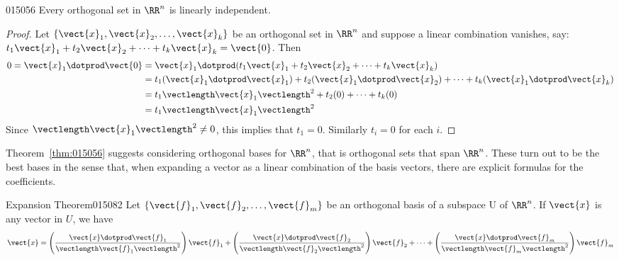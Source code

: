 \begin{theorem}{}{015056} %
Every orthogonal set in $\RR^n$ is linearly independent.
\end{theorem}

\begin{proof}
Let $\{\vect{x}_{1}, \vect{x}_{2}, \dots, \vect{x}_{k}\}$ be an orthogonal set in $\RR^n$ and suppose a linear combination vanishes, say: $t_{1}\vect{x}_{1} + t_{2}\vect{x}_{2} + \dots + t_{k}\vect{x}_{k} = \vect{0}$. Then
\begin{align*}
0 = \vect{x}_1 \dotprod \vect{0} &= \vect{x}_1 \dotprod (t_1\vect{x}_1 + t_2\vect{x}_2 + \dots + t_k\vect{x}_k) \\
&= t_1(\vect{x}_1 \dotprod \vect{x}_1) + t_2(\vect{x}_1 \dotprod \vect{x}_2) + \dots + t_k(\vect{x}_1 \dotprod \vect{x}_k) \\
&= t_1\vectlength\vect{x}_1\vectlength^2 +t_2(0) + \dots + t_k(0) \\
&= t_1\vectlength\vect{x}_1\vectlength^2
\end{align*}
Since $\vectlength\vect{x}_{1}\vectlength^{2} \neq 0$, this implies that $t_{1} = 0$. Similarly $t_{i} = 0$ for each $i$.
\end{proof}

Theorem~\ref{thm:015056} suggests considering orthogonal bases for $\RR^n$, that is orthogonal sets that span $\RR^n$. These turn out to be the best bases in the sense that, when expanding a vector as a linear combination of the basis vectors, there are explicit formulas for the coefficients.

\begin{theorem}{Expansion Theorem}{015082} %
Let $\{\vect{f}_{1}, \vect{f}_{2}, \dots, \vect{f}_{m}\}$ be an orthogonal basis of a subspace U of $\RR^n$. If $\vect{x}$ is any vector in $U$, we have
\begin{equation*}
\vect{x} = \left(\frac{\vect{x} \dotprod \vect{f}_1}{\vectlength\vect{f}_1\vectlength^2} \right) \vect{f}_1 +
\left(\frac{\vect{x} \dotprod \vect{f}_2}{\vectlength\vect{f}_2\vectlength^2} \right) \vect{f}_2 +
\dots +
\left(\frac{\vect{x} \dotprod \vect{f}_m}{\vectlength\vect{f}_m\vectlength^2} \right) \vect{f}_m
\end{equation*}
\end{theorem}

